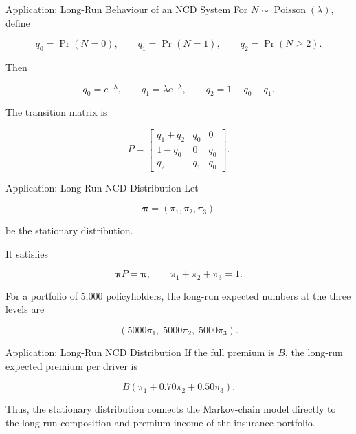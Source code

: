 \documentclass[
  ignorenonframetext,
  aspectratio=169,
]{beamer}
\begin{document}
\begin{frame}{Application: Long-Run Behaviour of an NCD System}
\protect{}\label{application-long-run-behaviour-of-an-ncd-system-1}
For \(N\sim\operatorname{Poisson}(\lambda)\), define

\[
q_0=\Pr(N=0),\qquad
q_1=\Pr(N=1),\qquad
q_2=\Pr(N\geq2).
\]

Then

\[
q_0=e^{-\lambda},
\qquad
q_1=\lambda e^{-\lambda},
\qquad
q_2=1-q_0-q_1.
\]

The transition matrix is

\[
\boxed{
P=
\begin{bmatrix}
q_1+q_2&q_0&0\\
1-q_0&0&q_0\\
q_2&q_1&q_0
\end{bmatrix}.
}
\]
\end{frame}

\begin{frame}{Application: Long-Run NCD Distribution}
\protect{}\label{application-long-run-ncd-distribution}
Let

\[
\boldsymbol{\pi}
=
(\pi_1,\pi_2,\pi_3)
\]

be the stationary distribution.

It satisfies

\[
\boldsymbol{\pi}P=\boldsymbol{\pi},
\qquad
\pi_1+\pi_2+\pi_3=1.
\]

For a portfolio of 5,000 policyholders, the long-run expected numbers at
the three levels are

\[
\boxed{
(5000\pi_1,\;5000\pi_2,\;5000\pi_3).
}
\]
\end{frame}

\begin{frame}{Application: Long-Run NCD Distribution}
\protect{}\label{application-long-run-ncd-distribution-1}
If the full premium is \(B\), the long-run expected premium per driver
is

\[
\boxed{
B(\pi_1+0.70\pi_2+0.50\pi_3).
}
\]

Thus, the stationary distribution connects the Markov-chain model
directly to the long-run composition and premium income of the insurance
portfolio.
\end{frame}
\end{document}
